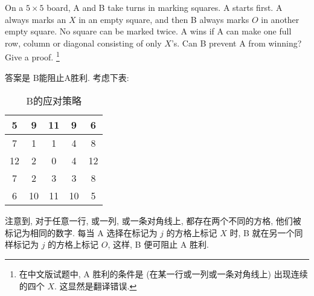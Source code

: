 \begin{prob}
\label{prob:prob-9}
On a $5 \times 5$ board, A and B take turns in marking squares.
A starts first. A always marks an $X$ in an empty square,
and then B always marks $O$ in another empty square.
No square can be marked twice. A wins if A can make one full row,
column or diagonal consisting of only $X$'s.
Can B prevent A from winning? Give a proof.
\footnote{在中文版试题中, A 胜利的条件是 (在某一行或一列或一条对角线上)
出现连续的四个 $X$. 这显然是翻译错误.}
\end{prob}

\begin{soln}
答案是 $\boxed{\text{B能阻止A胜利}.}$ 考虑下表:
\begin{table}[ht]
\centering
\begin{tabular}{|c|c|c|c|c|}
\hline 5 & 9 & 11 & 9 & 6 \\
\hline 7 & 1 & 1 & 4 & 8 \\
\hline 12 & 2 & 0 & 4 & 12 \\
\hline 7 & 2 & 3 & 3 & 8 \\
\hline 6 & 10 & 11 & 10 & 5 \\
\hline
\end{tabular}
\caption{B的应对策略}
\end{table}
注意到, 对于任意一行, 或一列, 或一条对角线上, 都存在两个不同的方格,
他们被标记为相同的数字. 每当 A 选择在标记为 $j$ 的方格上标记 $X$ 时,
B 就在另一个同样标记为 $j$ 的方格上标记 $O$, 这样, B 便可阻止 A 胜利.
\end{soln}
